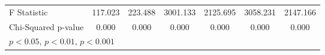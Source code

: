 \begin{table}[htbp]
\begin{tabular}{l*{6}{c}}
F Statistic         &     117.023         &     223.488         &    3001.133         &    2125.695         &    3058.231         &    2147.166         \\
Chi-Squared p-value &       0.000         &       0.000         &       0.000         &       0.000         &       0.000         &       0.000         \\
\hline\hline
\multicolumn{7}{l}{\footnotesize \sym{*} \(p<0.05\), \sym{**} \(p<0.01\), \sym{***} \(p<0.001\)}\\
\end{tabular}
\end{table}
